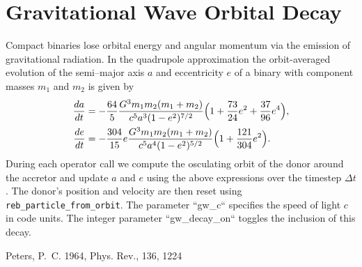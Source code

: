 \section{Gravitational Wave Orbital Decay}
\label{sec:gw_decay}

Compact binaries lose orbital energy and angular momentum via the emission of gravitational radiation.  In the quadrupole approximation the orbit-averaged evolution of the semi--major axis $a$ and eccentricity $e$ of a binary with component masses $m_1$ and $m_2$ is given by \citet{Peters1964}
\begin{align}
  \frac{da}{dt} &= -\frac{64}{5}\frac{G^3 m_1 m_2 (m_1+m_2)}{c^5 a^3 (1-e^2)^{7/2}}\Bigl(1+\frac{73}{24}e^2+\frac{37}{96}e^4\Bigr),\\
  \frac{de}{dt} &= -\frac{304}{15}e\frac{G^3 m_1 m_2 (m_1+m_2)}{c^5 a^4 (1-e^2)^{5/2}}\Bigl(1+\frac{121}{304}e^2\Bigr).
\end{align}
During each operator call we compute the osculating orbit of the donor around the accretor and update $a$ and $e$ using the above expressions over the timestep $\Delta t$.  The donor's position and velocity are then reset using \texttt{reb\_particle\_from\_orbit}.  The parameter ``gw\_c`` specifies the speed of light $c$ in code units.  The integer parameter ``gw\_decay\_on`` toggles the inclusion of this decay.


\begin{thebibliography}{99}
 Peters, P.~C. 1964, Phys. Rev., 136, 1224
\end{thebibliography}
